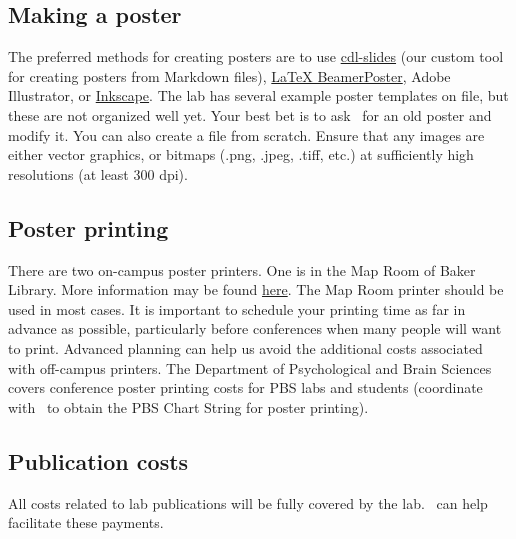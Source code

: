 \documentclass{tufte-book} %
\begin{document}
 \subsection{Making a poster}
  The preferred methods for creating posters are to use
 \href{https://github.com/ContextLab/cdl-slides}{cdl-slides} (our
 custom tool for creating posters from Markdown files),
 \href{https://github.com/deselaers/latex-beamerposter}{LaTeX
   BeamerPoster}, Adobe Illustrator, or
 \href{https://inkscape.org/en/}{Inkscape}.  The lab has several
 example poster templates on file, but these are not organized well
 yet.  Your best bet is to ask \director~for an old poster and modify
 it.  You can also create a file from scratch.  Ensure that any images
 are either vector graphics, or bitmaps (.png, .jpeg, .tiff, etc.) at
 sufficiently high resolutions (at least 300 dpi).


 \subsection{Poster printing}
   There are two
 on-campus poster printers.  One is in the Map Room of Baker Library.
 More information may be found
 \href{http://www.dartmouth.edu/~library/maproom/printingfaq.html}{here}.
 The Map Room printer should be used in most cases.  It is important
 to schedule your printing time as far in advance as possible,
 particularly before conferences when many people will want to print.
 Advanced planning can help us avoid the additional costs associated
 with off-campus printers.  The Department of Psychological and Brain
 Sciences covers conference poster printing costs for PBS labs and
 students (coordinate with \coordinator~to obtain the PBS Chart String
 for poster printing).


 \subsection{Publication costs}
 All costs related to lab publications will be fully covered by the
 lab.  \coordinator~can help facilitate these payments.
\end{document}
